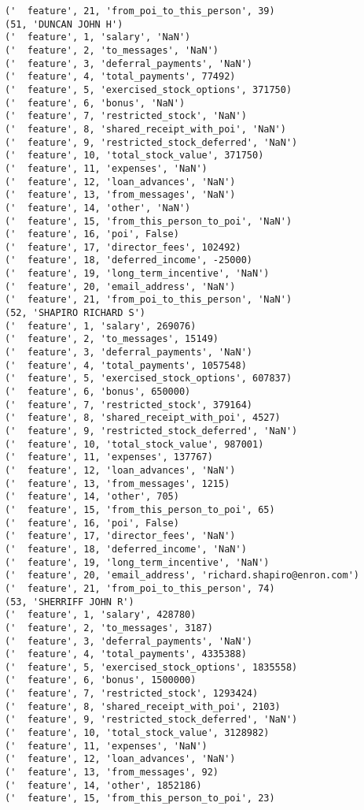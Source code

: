 \begin{verbatim}
('  feature', 21, 'from_poi_to_this_person', 39)
(51, 'DUNCAN JOHN H')
('  feature', 1, 'salary', 'NaN')
('  feature', 2, 'to_messages', 'NaN')
('  feature', 3, 'deferral_payments', 'NaN')
('  feature', 4, 'total_payments', 77492)
('  feature', 5, 'exercised_stock_options', 371750)
('  feature', 6, 'bonus', 'NaN')
('  feature', 7, 'restricted_stock', 'NaN')
('  feature', 8, 'shared_receipt_with_poi', 'NaN')
('  feature', 9, 'restricted_stock_deferred', 'NaN')
('  feature', 10, 'total_stock_value', 371750)
('  feature', 11, 'expenses', 'NaN')
('  feature', 12, 'loan_advances', 'NaN')
('  feature', 13, 'from_messages', 'NaN')
('  feature', 14, 'other', 'NaN')
('  feature', 15, 'from_this_person_to_poi', 'NaN')
('  feature', 16, 'poi', False)
('  feature', 17, 'director_fees', 102492)
('  feature', 18, 'deferred_income', -25000)
('  feature', 19, 'long_term_incentive', 'NaN')
('  feature', 20, 'email_address', 'NaN')
('  feature', 21, 'from_poi_to_this_person', 'NaN')
(52, 'SHAPIRO RICHARD S')
('  feature', 1, 'salary', 269076)
('  feature', 2, 'to_messages', 15149)
('  feature', 3, 'deferral_payments', 'NaN')
('  feature', 4, 'total_payments', 1057548)
('  feature', 5, 'exercised_stock_options', 607837)
('  feature', 6, 'bonus', 650000)
('  feature', 7, 'restricted_stock', 379164)
('  feature', 8, 'shared_receipt_with_poi', 4527)
('  feature', 9, 'restricted_stock_deferred', 'NaN')
('  feature', 10, 'total_stock_value', 987001)
('  feature', 11, 'expenses', 137767)
('  feature', 12, 'loan_advances', 'NaN')
('  feature', 13, 'from_messages', 1215)
('  feature', 14, 'other', 705)
('  feature', 15, 'from_this_person_to_poi', 65)
('  feature', 16, 'poi', False)
('  feature', 17, 'director_fees', 'NaN')
('  feature', 18, 'deferred_income', 'NaN')
('  feature', 19, 'long_term_incentive', 'NaN')
('  feature', 20, 'email_address', 'richard.shapiro@enron.com')
('  feature', 21, 'from_poi_to_this_person', 74)
(53, 'SHERRIFF JOHN R')
('  feature', 1, 'salary', 428780)
('  feature', 2, 'to_messages', 3187)
('  feature', 3, 'deferral_payments', 'NaN')
('  feature', 4, 'total_payments', 4335388)
('  feature', 5, 'exercised_stock_options', 1835558)
('  feature', 6, 'bonus', 1500000)
('  feature', 7, 'restricted_stock', 1293424)
('  feature', 8, 'shared_receipt_with_poi', 2103)
('  feature', 9, 'restricted_stock_deferred', 'NaN')
('  feature', 10, 'total_stock_value', 3128982)
('  feature', 11, 'expenses', 'NaN')
('  feature', 12, 'loan_advances', 'NaN')
('  feature', 13, 'from_messages', 92)
('  feature', 14, 'other', 1852186)
('  feature', 15, 'from_this_person_to_poi', 23)

\end{verbatim}
